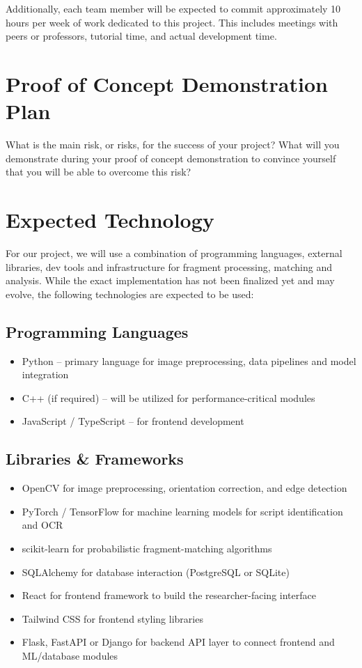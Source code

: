 \documentclass{article}
\begin{document}
\noindent
Additionally, each team member will be expected to commit approximately 10 hours per week of work dedicated to this project. This includes meetings with peers or professors, tutorial time, and actual development time.


\section{Proof of Concept Demonstration Plan}

What is the main risk, or risks, for the success of your project?  What will you
demonstrate during your proof of concept demonstration to convince yourself that
you will be able to overcome this risk?

\section{Expected Technology}

\noindent For our project, we will use a combination of programming languages, external libraries, dev tools and infrastructure for fragment processing, matching and analysis. While the exact implementation has not been finalized yet and may evolve, the following technologies are expected to be used:

\subsection*{Programming Languages}
\begin{itemize}
    \item Python -- primary language for image preprocessing, data pipelines and model integration
    \item C++ (if required) -- will be utilized for performance-critical modules
    \item JavaScript / TypeScript -- for frontend development
\end{itemize}

\subsection*{Libraries \& Frameworks}
\begin{itemize}
    \item OpenCV for image preprocessing, orientation correction, and edge detection
    \item PyTorch / TensorFlow for machine learning models for script identification and OCR
    \item scikit-learn for probabilistic fragment-matching algorithms
    \item SQLAlchemy for database interaction (PostgreSQL or SQLite)
    \item React for frontend framework to build the researcher-facing interface
    \item Tailwind CSS for frontend styling libraries
    \item Flask, FastAPI or Django for backend API layer to connect frontend and ML/database modules
\end{itemize}
\end{document}
